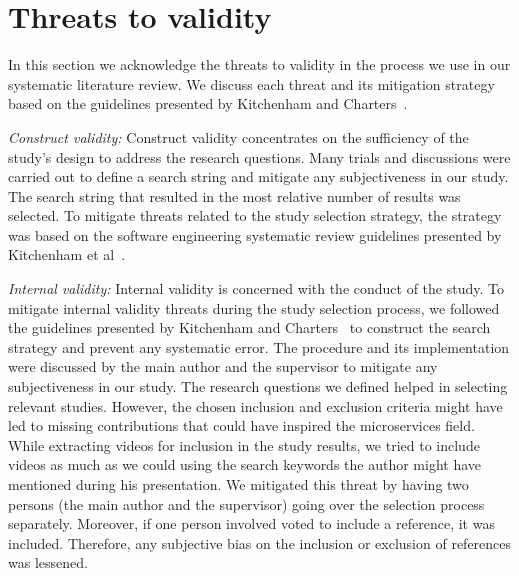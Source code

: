 
\section{Threats to validity}\label{sec:threats}
In this section we acknowledge the threats to validity in the process we use in our systematic
literature review. We discuss each threat and its mitigation strategy based on the guidelines presented by Kitchenham and Charters~\cite{Kitchenham2007}.


\par \textit{Construct validity:} 
Construct validity concentrates on the sufficiency of the study's design to address the research questions. Many trials and discussions were carried out to define a search string and mitigate any subjectiveness in our study. The search string that resulted in the most relative number of results was selected. To mitigate threats related to the study selection strategy, the strategy was based on the software engineering systematic review guidelines presented by Kitchenham et al~\cite{kitchenham2015}.

 
\par \textit{Internal validity:} 
Internal validity is concerned with the conduct of the study. To mitigate internal validity threats during the study selection process, we followed the guidelines presented by Kitchenham and Charters~\cite{Kitchenham2007} to construct the search strategy and prevent any systematic error.
The procedure and its implementation were discussed by the main author and the supervisor to mitigate any subjectiveness in our study. The research questions we defined helped in selecting relevant studies. However, the chosen inclusion and exclusion criteria might have led to missing contributions that could have inspired the microservices field. While extracting videos for inclusion in the study results, we tried to include videos as much as we could using the search keywords the author might have mentioned during his presentation. We mitigated this threat by having two persons (the main author and the supervisor) going over the selection process separately. Moreover, if one person involved voted to include a reference, it was included. Therefore, any subjective bias on the inclusion or exclusion of references was lessened. 

